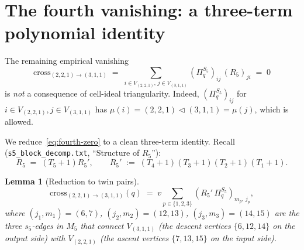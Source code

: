 \documentclass[11pt]{article}
\newtheorem{lemma}[theorem]{Lemma}
\theoremstyle{definition}
\begin{document}
\section{The fourth vanishing: a three-term polynomial identity}\label{sec:fourth}

The remaining empirical vanishing
\begin{equation}\label{eq:fourth-zero}
\mathrm{cross}_{(2,2,1) \to (3,1,1)} \;=\; \sum_{i \in V_{(2,2,1)},\, j \in V_{(3,1,1)}} (\Pi_q^{S_5})_{ij}\,(R_5)_{ji} \;=\; 0
\end{equation}
is \emph{not} a consequence of cell-ideal triangularity. Indeed, $(\Pi_q^{S_5})_{ij}$ for $i \in V_{(2,2,1)}, j \in V_{(3,1,1)}$ has $\mu(i) = (2,2,1) \triangleleft (3,1,1) = \mu(j)$, which is allowed.

We reduce~\eqref{eq:fourth-zero} to a clean three-term identity. Recall (\texttt{s5\_block\_decomp.txt}, ``Structure of $R_5$''):
\begin{equation}\label{eq:R5}
R_5 \;=\; (T_5+1) R_5', \qquad R_5' \;:=\; (T_4+1)(T_3+1)(T_2+1)(T_1+1).
\end{equation}

\begin{lemma}[Reduction to twin pairs]\label{lem:twin-reduction}
\[
\mathrm{cross}_{(2,2,1) \to (3,1,1)}(q) \;=\; v \sum_{p \in \{1,2,3\}} (R_5'\, \Pi_q^{S_5})_{m_p,\, j_p},
\]
where $(j_1,m_1)=(6,7)$, $(j_2,m_2)=(12,13)$, $(j_3,m_3)=(14,15)$ are the three $s_5$-edges in $M_5$ that connect $V_{(3,1,1)}$ (the descent vertices $\{6,12,14\}$ on the output side) with $V_{(2,2,1)}$ (the ascent vertices $\{7,13,15\}$ on the input side).
\end{lemma}
\end{document}
